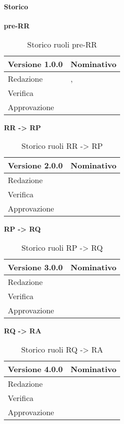 \newpage
\Large{\textbf{Storico }}\\
\normalsize \\

\textbf{pre-RR}
\label{tabVers1}
\begin{table}[h]
	\begin{tabular}{p{} p{}}
		\toprule \textbf{Versione 1.0.0}	&	\textbf{Nominativo}\\
		\midrule Redazione	& \FM, \PM\\
		\midrule Verifica &	\GP\\
		\midrule Approvazione	& \TP\\
		\bottomrule
	\end{tabular}
	\caption{Storico ruoli pre-RR}
\end{table}

\textbf{RR -> RP}
\label{tabVers2}
\begin{table}[h]
	\begin{tabular}{p{} p{}}
		\toprule \textbf{Versione 2.0.0}	&	\textbf{Nominativo}\\
		\midrule Redazione	& \VG\\
		\midrule Verifica &	\GP\\
		\midrule Approvazione	& \PM\\
		\bottomrule
	\end{tabular}
	\caption{Storico ruoli RR -> RP}
\end{table}


\textbf{RP -> RQ}
\label{tabVers3}
\begin{table}[h]
	\begin{tabular}{p{} p{}}
		\toprule \textbf{Versione 3.0.0}	&	\textbf{Nominativo}\\
		\midrule Redazione	& \VG\\
		\midrule Verifica &	\PM\\
		\midrule Approvazione	& \FM\\
		\bottomrule
	\end{tabular}
	\caption{Storico ruoli RP -> RQ}
\end{table}

\textbf{RQ -> RA}
\label{tabVers4}
\begin{table}[h]
	\begin{tabular}{p{} p{}}
		\toprule \textbf{Versione 4.0.0}	&	\textbf{Nominativo}\\
		\midrule Redazione	& \PM\\
		\midrule Verifica &	\TP\\
		\midrule Approvazione	& \FM\\
		\bottomrule
	\end{tabular}
	\caption{Storico ruoli RQ -> RA}
\end{table}